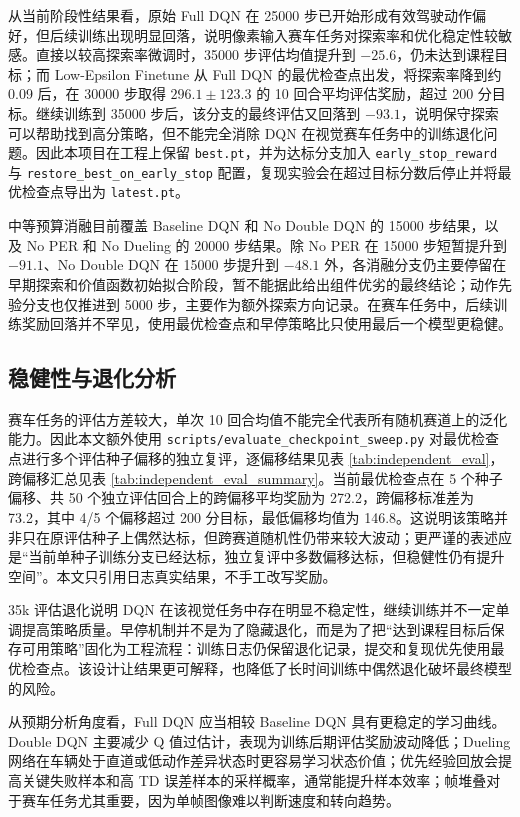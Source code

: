 \documentclass[UTF8,a4paper,12pt]{ctexart}
\begin{document}
从当前阶段性结果看，原始 Full DQN 在 25000 步已开始形成有效驾驶动作偏好，但后续训练出现明显回落，说明像素输入赛车任务对探索率和优化稳定性较敏感。直接以较高探索率微调时，35000 步评估均值提升到 $-25.6$，仍未达到课程目标；而 Low-Epsilon Finetune 从 Full DQN 的最优检查点出发，将探索率降到约 0.09 后，在 30000 步取得 $296.1\pm123.3$ 的 10 回合平均评估奖励，超过 200 分目标。继续训练到 35000 步后，该分支的最终评估又回落到 $-93.1$，说明保守探索可以帮助找到高分策略，但不能完全消除 DQN 在视觉赛车任务中的训练退化问题。因此本项目在工程上保留 \texttt{best.pt}，并为达标分支加入 \texttt{early\_stop\_reward} 与 \texttt{restore\_best\_on\_early\_stop} 配置，复现实验会在超过目标分数后停止并将最优检查点导出为 \texttt{latest.pt}。

中等预算消融目前覆盖 Baseline DQN 和 No Double DQN 的 15000 步结果，以及 No PER 和 No Dueling 的 20000 步结果。除 No PER 在 15000 步短暂提升到 $-91.1$、No Double DQN 在 15000 步提升到 $-48.1$ 外，各消融分支仍主要停留在早期探索和价值函数初始拟合阶段，暂不能据此给出组件优劣的最终结论；动作先验分支也仅推进到 5000 步，主要作为额外探索方向记录。在赛车任务中，后续训练奖励回落并不罕见，使用最优检查点和早停策略比只使用最后一个模型更稳健。

\subsection{稳健性与退化分析}

赛车任务的评估方差较大，单次 10 回合均值不能完全代表所有随机赛道上的泛化能力。因此本文额外使用 \texttt{scripts/evaluate\_checkpoint\_sweep.py} 对最优检查点进行多个评估种子偏移的独立复评，逐偏移结果见表 \ref{tab:independent_eval}，跨偏移汇总见表 \ref{tab:independent_eval_summary}。当前最优检查点在 5 个种子偏移、共 50 个独立评估回合上的跨偏移平均奖励为 272.2，跨偏移标准差为 73.2，其中 4/5 个偏移超过 200 分目标，最低偏移均值为 146.8。这说明该策略并非只在原评估种子上偶然达标，但跨赛道随机性仍带来较大波动；更严谨的表述应是“当前单种子训练分支已经达标，独立复评中多数偏移达标，但稳健性仍有提升空间”。本文只引用日志真实结果，不手工改写奖励。

35k 评估退化说明 DQN 在该视觉任务中存在明显不稳定性，继续训练并不一定单调提高策略质量。早停机制并不是为了隐藏退化，而是为了把“达到课程目标后保存可用策略”固化为工程流程：训练日志仍保留退化记录，提交和复现优先使用最优检查点。该设计让结果更可解释，也降低了长时间训练中偶然退化破坏最终模型的风险。

从预期分析角度看，Full DQN 应当相较 Baseline DQN 具有更稳定的学习曲线。Double DQN 主要减少 Q 值过估计，表现为训练后期评估奖励波动降低；Dueling 网络在车辆处于直道或低动作差异状态时更容易学习状态价值；优先经验回放会提高关键失败样本和高 TD 误差样本的采样概率，通常能提升样本效率；帧堆叠对于赛车任务尤其重要，因为单帧图像难以判断速度和转向趋势。
\end{document}
